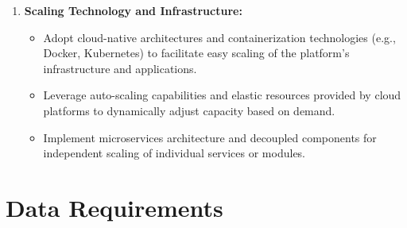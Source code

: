\begin{enumerate}[resume]
  \item \textbf{Scaling Technology and Infrastructure:}
  \begin{itemize}[label=--,leftmargin=*,parsep=0pt]
      \item Adopt cloud-native architectures and containerization technologies
      (e.g., Docker, Kubernetes) to facilitate easy scaling of the platform's
      infrastructure and applications.
      \item Leverage auto-scaling capabilities and elastic resources provided by
      cloud platforms to dynamically adjust capacity based on demand.
      \item Implement microservices architecture and decoupled components for
      independent scaling of individual services or modules.
  \end{itemize}
\end{enumerate}

\section{Data Requirements}


